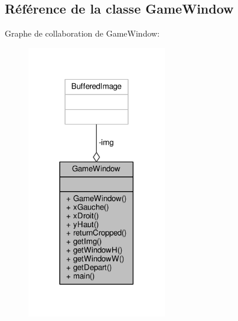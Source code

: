 \hypertarget{classGameWindow}{}\subsection{Référence de la classe Game\+Window}
\label{classGameWindow}


Graphe de collaboration de Game\+Window\+:\nopagebreak
\begin{figure}[H]
\begin{center}
\leavevmode
\includegraphics[width=173pt]{classGameWindow__coll__graph}
\end{center}
\end{figure}
